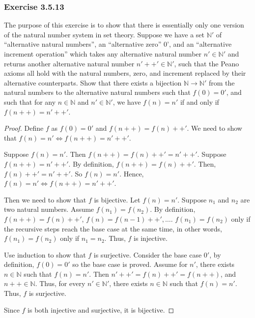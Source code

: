 \documentclass[12pt, letter]{article}
\begin{document}
\subsubsection*{Exercise 3.5.13}
The purpose of this exercise is to show that there is essentially only one version of the natural number system in set theory. Suppose we have a set $\mathbb{N}'$ of ``alternative natural numbers'', an ``alternative zero'' 0', and 
an ``alternative increment operation'' which takes any alternative natural number $n'\in\mathbb{N}'$ and returns another alternative natural number $n'++'\in\mathbb{N}'$, such that the Peano axioms all hold with the natural numbers, zero, and increment replaced by their alternative counterparts.
Show that there exists a bijection $\mathbb{N}\to \mathbb{N}'$ from the natural numbers to the alternative natural numbers such that $f(0)=0'$, and such that for any $n\in\mathbb{N}$ and $n'\in\mathbb{N}'$, we have $f(n)=n'$ if and only if $f(n++)=n'++'$.
\begin{proof}
    Define $f$ as $f(0)=0'$ and $f(n++)=f(n)++'$. We need to show that $f(n)=n'\iff f(n++)=n'++'$.

    Suppose $f(n)=n'$. Then $f(n++)=f(n)++'=n'++'$. Suppose $f(n++)=n'++'$. By definition, $f(n++)=f(n)++'$. Then, $f(n)++'=n'++'$. So $f(n)=n'$. Hence, $f(n)=n'\iff f(n++)=n'++'$.

    Then we need to show that $f$ is bijective. Let $f(n)=n'$. Suppose $n_1$ and $n_2$ are two natural numbers. Assume $f(n_1)=f(n_2)$. By definition, $f(n++)=f(n)++'$, $f(n)=f(n-1)++',\dotsc$. $f(n_1)=f(n_2)$ only if the recursive steps reach the base case at the same time, in other words,
    $f(n_1)=f(n_2)$ only if $n_1=n_2$. Thus, $f$ is injective. 

    Use induction to show that $f$ is surjective. Consider the base case $0'$, by definition, $f(0)=0'$ so the base case is proved. Assume for $n'$, there exists $n\in \mathbb{N}$ such that $f(n)=n'$. Then 
    $n'++'=f(n)++'=f(n++)$, and $n++\in\mathbb{N}$. Thus, for every $n'\in\mathbb{N}'$, there exists $n\in\mathbb{N}$ such that $f(n)=n'$. Thus, $f$ is surjective.

    Since $f$ is both injective and surjective, it is bijective.
\end{proof}
\end{document}
